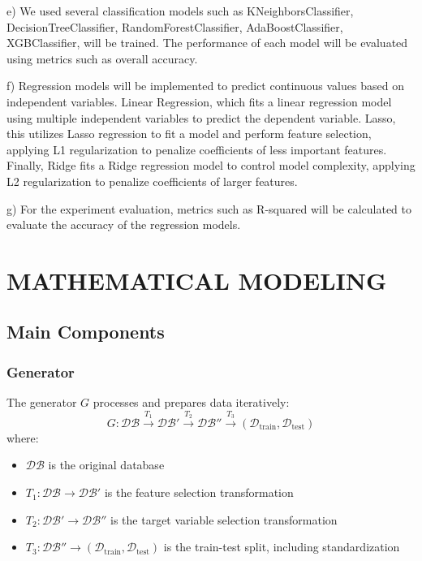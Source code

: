 \documentclass{article}
\begin{document}
\begin{multicols}{2}
e) We used several classification models such as KNeighborsClassifier, DecisionTreeClassifier, RandomForestClassifier, AdaBoostClassifier, XGBClassifier, will be trained. The performance of each model will be evaluated using metrics such as overall accuracy.

f) Regression models will be implemented to predict continuous values based on independent variables. Linear Regression, which fits a linear regression model using multiple independent variables to predict the dependent variable. Lasso, this utilizes Lasso regression to fit a model and perform feature selection, applying L1 regularization to penalize coefficients of less important features. Finally, Ridge fits a Ridge regression model to control model complexity, applying L2 regularization to penalize coefficients of larger features.

g) For the experiment evaluation, metrics such as R-squared will be calculated to evaluate the accuracy of the regression models.
\end{multicols}

\section{MATHEMATICAL MODELING}
\subsection{Main Components}

\subsubsection{Generator}
The generator $G$ processes and prepares data iteratively:
\begin{equation}
    G: \mathcal{DB} \xrightarrow{T_1} \mathcal{DB}' \xrightarrow{T_2} \mathcal{DB}'' \xrightarrow{T_3} (\mathcal{D}_{\text{train}}, \mathcal{D}_{\text{test}})
\end{equation}
where:
\begin{itemize}
    \item $\mathcal{DB}$ is the original database
    \item $T_1: \mathcal{DB} \rightarrow \mathcal{DB}'$ is the feature selection transformation
    \item $T_2: \mathcal{DB}' \rightarrow \mathcal{DB}''$ is the target variable selection transformation
    \item $T_3: \mathcal{DB}'' \rightarrow (\mathcal{D}_{\text{train}}, \mathcal{D}_{\text{test}})$ is the train-test split, including standardization
\end{itemize}
\end{document}
